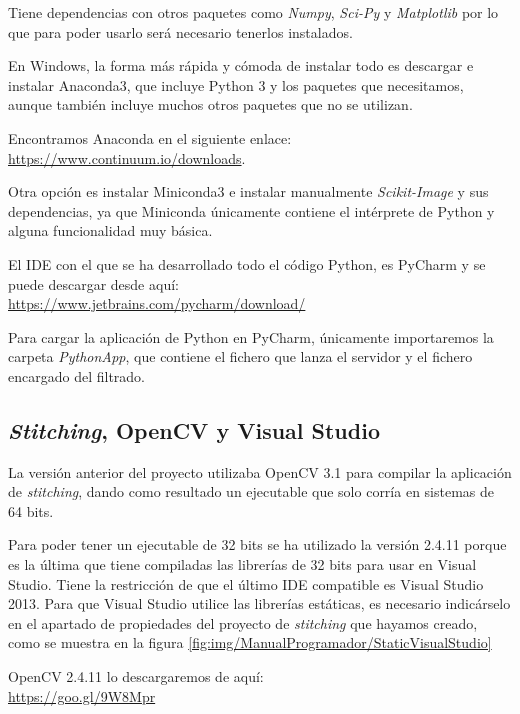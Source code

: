 Tiene dependencias con otros paquetes como \textit{Numpy}, \textit{Sci-Py} y \textit{Matplotlib} por lo que para poder usarlo será necesario tenerlos instalados. 

En Windows, la forma más rápida y cómoda de instalar todo es descargar e instalar Anaconda3, que incluye Python 3 y los paquetes que necesitamos, aunque también incluye muchos otros paquetes que no se utilizan.

Encontramos Anaconda en el siguiente enlace:\\
\url{https://www.continuum.io/downloads}.


Otra opción es instalar Miniconda3 e instalar manualmente \textit{Scikit-Image} y sus dependencias, ya que Miniconda únicamente contiene el intérprete de Python y alguna funcionalidad muy básica.

El IDE con el que se ha desarrollado todo el código Python, es PyCharm y se puede descargar desde aquí:\\ \url{https://www.jetbrains.com/pycharm/download/}

Para cargar la aplicación de Python en PyCharm, únicamente importaremos la carpeta \textit{PythonApp}, que contiene el fichero que lanza el servidor y el fichero encargado del filtrado. 


\subsection{\textit{Stitching}, OpenCV y Visual Studio}
La versión anterior del proyecto \cite{perikymataV1} utilizaba OpenCV 3.1 para compilar la aplicación de \textit{stitching}, dando como resultado un ejecutable que solo corría en sistemas de 64 bits.

Para poder tener un ejecutable de 32 bits se ha utilizado la versión 2.4.11 porque es la última que tiene compiladas las librerías de 32 bits para usar en Visual Studio. Tiene la restricción de que el último IDE compatible es Visual Studio 2013. Para que Visual Studio utilice las librerías estáticas, es necesario indicárselo en el apartado de propiedades del proyecto de \textit{stitching} que hayamos creado, como se muestra en la figura \ref{fig:img/ManualProgramador/StaticVisualStudio}



OpenCV 2.4.11 lo descargaremos de aquí:\\ \url{https://goo.gl/9W8Mpr}

